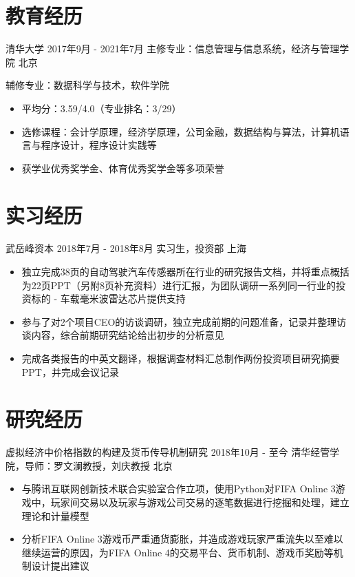 \documentclass{resumeZH}
\begin{document}

    \section{教育经历}
    \Experience
    {清华大学}
    {2017年9月 - 2021年7月}
    {主修专业：信息管理与信息系统，经济与管理学院}
    {北京}

    辅修专业：数据科学与技术，软件学院
    \begin{itemize}
        \item 平均分：3.59/4.0（专业排名：3/29）
        \item 选修课程：会计学原理，经济学原理，公司金融，数据结构与算法，计算机语言与程序设计，程序设计实践等
        \item 获学业优秀奖学金、体育优秀奖学金等多项荣誉
    \end{itemize}

    \section{实习经历}
    \Experience
    {武岳峰资本}
    {2018年7月 - 2018年8月}
    {实习生，投资部}
    {上海}
    \begin{itemize}
        \item 独立完成38页的自动驾驶汽车传感器所在行业的研究报告文档，并将重点概括为22页PPT（另附8页补充资料）进行汇报，为团队调研一系列同一行业的投资标的 - 车载毫米波雷达芯片提供支持
        \item 参与了对2个项目CEO的访谈调研，独立完成前期的问题准备，记录并整理访谈内容，综合前期研究结论给出初步的分析意见
        \item 完成各类报告的中英文翻译，根据调查材料汇总制作两份投资项目研究摘要PPT，并完成会议记录
    \end{itemize}

    \section{研究经历}
    \Experience
    {虚拟经济中价格指数的构建及货币传导机制研究}
    {2018年10月 - 至今}
    {清华经管学院，导师：罗文澜教授，刘庆教授}
    {北京}

    \begin{itemize}
        \item 与腾讯互联网创新技术联合实验室合作立项，使用Python对FIFA Online 3游戏中，玩家间交易以及玩家与游戏公司交易的逐笔数据进行挖掘和处理，建立理论和计量模型
        \item 分析FIFA Online 3游戏币严重通货膨胀，并造成游戏玩家严重流失以至难以继续运营的原因，为FIFA Online 4的交易平台、货币机制、游戏币奖励等机制设计提出建议
    \end{itemize}
\end{document}
